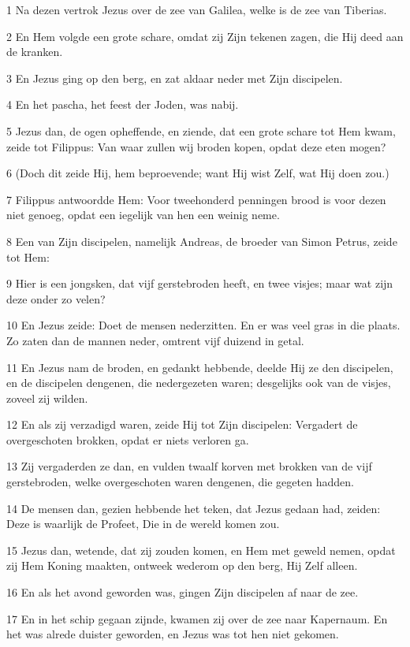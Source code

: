 \par 1 Na dezen vertrok Jezus over de zee van Galilea, welke is de zee van Tiberias.
\par 2 En Hem volgde een grote schare, omdat zij Zijn tekenen zagen, die Hij deed aan de kranken.
\par 3 En Jezus ging op den berg, en zat aldaar neder met Zijn discipelen.
\par 4 En het pascha, het feest der Joden, was nabij.
\par 5 Jezus dan, de ogen opheffende, en ziende, dat een grote schare tot Hem kwam, zeide tot Filippus: Van waar zullen wij broden kopen, opdat deze eten mogen?
\par 6 (Doch dit zeide Hij, hem beproevende; want Hij wist Zelf, wat Hij doen zou.)
\par 7 Filippus antwoordde Hem: Voor tweehonderd penningen brood is voor dezen niet genoeg, opdat een iegelijk van hen een weinig neme.
\par 8 Een van Zijn discipelen, namelijk Andreas, de broeder van Simon Petrus, zeide tot Hem:
\par 9 Hier is een jongsken, dat vijf gerstebroden heeft, en twee visjes; maar wat zijn deze onder zo velen?
\par 10 En Jezus zeide: Doet de mensen nederzitten. En er was veel gras in die plaats. Zo zaten dan de mannen neder, omtrent vijf duizend in getal.
\par 11 En Jezus nam de broden, en gedankt hebbende, deelde Hij ze den discipelen, en de discipelen dengenen, die nedergezeten waren; desgelijks ook van de visjes, zoveel zij wilden.
\par 12 En als zij verzadigd waren, zeide Hij tot Zijn discipelen: Vergadert de overgeschoten brokken, opdat er niets verloren ga.
\par 13 Zij vergaderden ze dan, en vulden twaalf korven met brokken van de vijf gerstebroden, welke overgeschoten waren dengenen, die gegeten hadden.
\par 14 De mensen dan, gezien hebbende het teken, dat Jezus gedaan had, zeiden: Deze is waarlijk de Profeet, Die in de wereld komen zou.
\par 15 Jezus dan, wetende, dat zij zouden komen, en Hem met geweld nemen, opdat zij Hem Koning maakten, ontweek wederom op den berg, Hij Zelf alleen.
\par 16 En als het avond geworden was, gingen Zijn discipelen af naar de zee.
\par 17 En in het schip gegaan zijnde, kwamen zij over de zee naar Kapernaum. En het was alrede duister geworden, en Jezus was tot hen niet gekomen.
